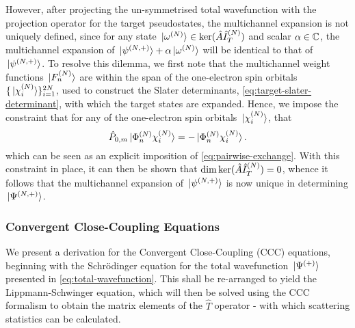 \documentclass[draft]{article}
\begin{document}
However, after projecting the un-symmetrised total wavefunction with the
projection operator for the target pseudostates, the multichannel expansion is
not uniquely defined, since for any state
$\ket*{\omega^{(N)}} \in \ker(\hat{A}\hat{I}_{T}^{(N)})$ and scalar
$\alpha \in \mathbb{C}$, the multichannel
expansion of $\ket*{\psi^{(N, +)}} + \alpha \ket*{\omega^{(N)}}$ will be
identical to that of $\ket*{\psi^{(N, +)}}$.
To resolve this dilemma, we first note that the multichannel weight functions
$\ket*{F_{n}^{(N)}}$ are within the span of the one-electron spin orbitals
$\lbrace\ket*{\chi_{i}^{(N)}}\rbrace_{i = 1}^{2N}$, used to construct the Slater
determinants, \autoref{eq:target-slater-determinant}, with which the target
states are expanded.
Hence, we impose the constraint that for any of the one-electron spin orbitals
$\ket*{\chi_{i}^{(N)}}$, that
\begin{equation}
  \label{eq:multichannel-constraint}
  \hat{P}_{0, m}
  \ket*{\Phi_{n}^{(N)} \chi_{i}^{(N)}}
  =
  -
  \ket*{\Phi_{n}^{(N)} \chi_{i}^{(N)}}
  .
\end{equation}
which can be seen as an explicit imposition of \autoref{eq:pairwise-exchange}.
With this constraint in place, it can then be shown that
$\dim\ker(\hat{A}\hat{I}_{T}^{(N)}) = 0$, whence it follows that the
multichannel expansion of $\ket*{\psi^{(N, +)}}$ is now unique in determining
$\ket*{\Psi^{(N, +)}}$.

\subsubsection{Convergent Close-Coupling Equations}
\label{sec:ccc-equations}

We present a derivation for the Convergent Close-Coupling (CCC) equations,
beginning with the Schr\"odinger equation for the total wavefunction
$\ket*{\Psi^{(+)}}$ presented in \autoref{eq:total-wavefunction}.
This shall be re-arranged to yield the Lippmann-Schwinger equation, which will
then be solved using the CCC formalism to obtain the matrix elements of the
$\hat{T}$ operator - with which scattering statistics can be calculated.
\end{document}
